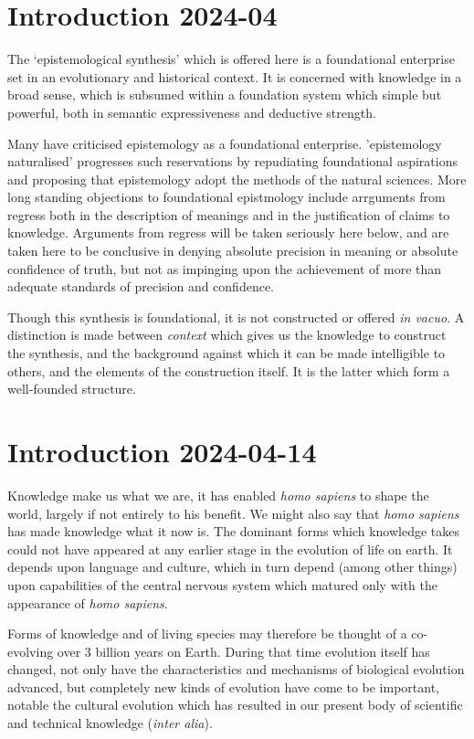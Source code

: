 \documentclass[10pt,titlepage]{book}
\begin{document}
\chapter{Introduction 2024-04}

The `epistemological synthesis' which is offered here is a foundational enterprise set in an evolutionary and historical context.
It is concerned with knowledge in a broad sense, which is subsumed within a foundation system which simple but powerful, both in semantic expressiveness and deductive strength.

Many have criticised epistemology as a foundational enterprise.
'epistemology naturalised' progresses such reservations by repudiating foundational aspirations and proposing that epistemology adopt the methods of the natural sciences.
More long standing objections to foundational epistmology include arrguments from regress both in the description of meanings and in the justification of claims to knowledge.
Arguments from regress will be taken seriously here below, and are taken here to be conclusive in denying absolute precision in meaning or absolute confidence of truth, but not as impinging upon the achievement of more than adequate standards of precision and confidence.

Though this synthesis is foundational, it is not constructed or offered \emph{in vacuo}.
A distinction is made between \emph{context} which gives us the knowledge to construct the synthesis, and the background against which it can be made intelligible to others, and the elements of the construction itself.
It is the latter which form a well-founded structure.



\chapter{Introduction 2024-04-14}

Knowledge make us what we are, it has enabled \emph{homo sapiens} to shape the world, largely if not entirely to his benefit.
We might also say that \emph{homo sapiens} has made knowledge what it now is.
The dominant forms which knowledge takes could not have appeared at any earlier stage in the evolution of life on earth.
It depends upon language and culture, which in turn depend (among other things)  upon capabilities of the central nervous system which matured only with the appearance of \emph{homo sapiens}.

Forms of knowledge and of living species may therefore be thought of a co-evolving over 3 billion years on Earth.
During that time evolution itself has changed, not only have the characteristics and mechanisms of biological evolution advanced, but completely new kinds of evolution have come to be important, notable the cultural evolution which has resulted in our present body of scientific and technical knowledge (\emph{inter alia}).
\end{document}
